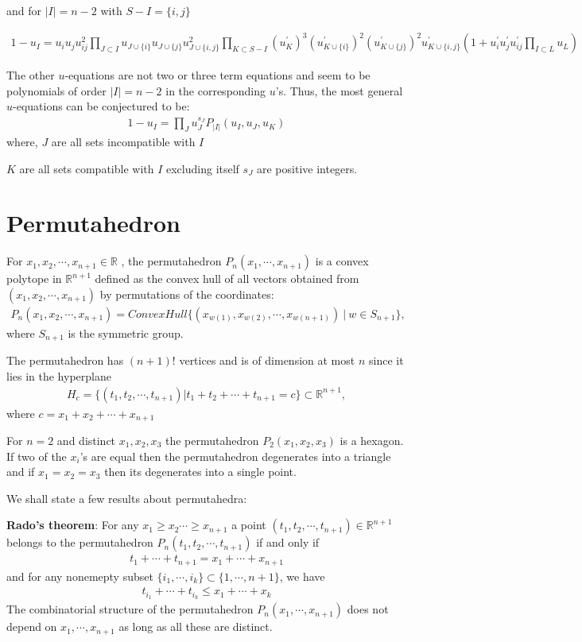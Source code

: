 \documentclass[hidelinks,12pt]{article}
\newcommand{\bea}[1]{\begin{eqnarray}\label{#1} }
\newcommand{\eea}{\end{eqnarray}}
\def\bea{\begin{eqnarray}}
\def\eea{\end{eqnarray}}
\begin{document}
\begin{enumerate}
and for $|I| =n-2$ with $S- I = \{i, j\}$

\bea
1-u_{I}= u_i u_j u^{2}_{ij} \prod_{J \subset I} u_{J \cup \{i\}} u_{J \cup \{j\}} u^{2}_{J \cup \{i,j\}} \prod_{K \subset S-I} (u^{'}_K)^{3} (u^{'}_{K \cup \{i\}})^{2}  (u^{'}_{K \cup\{j\}})^{2}  u^{'}_{K\cup \{i,j\}} \left( 1+ u^{'}_i u^{'}_j u^{'}_{ij} \prod_{I \subset L} u_L \right)                       \nonumber
\eea
   
The other $u$-equations are not two or three term equations and seem to be polynomials of order $|I|=n-2$ in the corresponding $u$'s. Thus, the most general $u$-equations can be conjectured to be:
\bea
1-u_{I} = \prod_{J} u^{s_J}_{J} P_{|I|}(u_I, u_J,u_K) 
\eea
where, $J$ are all sets incompatible with $I$

 $K$ are all sets compatible with $I$ excluding itself 
 $s_J$ are positive integers. 

\end{enumerate}
 





\section*{Permutahedron}
 For $x_1,x_2, \cdots, x_{n+1} \in \mathbb{R} $ , the permutahedron $P_n(x_1,\cdots,x_{n+1})$ is a convex polytope in $\mathbb{R}^{n+1}$ defined as the convex hull of all vectors obtained from $(x_1,x_2, \cdots, x_{n+1})$ by permutations of the coordinates:
 \bea
 P_n(x_1,x_2, \cdots, x_{n+1}) = ConvexHull \{ (x_{w(1)},x_{w(2)}, \cdots, x_{w(n+1)})~ |~ w \in S_{n+1} \}, \nonumber
 \eea
 where $S_{n+1}$ is the symmetric group. 
 
 The permutahedron has $(n+1)!$ vertices and is of dimension at most $n$ since it lies in the hyperplane 
 \bea
 H_c= \{(t_1,t_2, \cdots, t_{n+1}) | t_1 + t_2 + \cdots + t_{n+1}= c \} \subset \mathbb{R}^{n+1}, \nonumber
 \eea
where $c= x_1+x_2+ \cdots +x_{n+1}$

For $n=2$ and distinct $x_1,x_2, x_3$ the permutahedron $P_2(x_1,x_2, x_3)$ is a hexagon. If two of the $x_i$'s are equal then the permutahedron degenerates into a triangle and if $x_1= x_2 = x_3$ then its degenerates into a single point.

We shall state a few results about permutahedra:

{\bf Rado's theorem}: For any $x_1 \ge x_2  \cdots \ge x_{n+1}$ a point $(t_1,t_2, \cdots, t_{n+1}) \in \mathbb{R}^{n+1}$ belongs to the permutahedron $P_n(t_1,t_2, \cdots, t_{n+1})$ if and only if 
\bea
t_1+ \cdots +t_{n+1} = x_1 +\cdots+ x_{n+1} \nonumber
\eea
and for any nonemepty subset $\{i_1,\cdots,i_k \} \subset \{1,\cdots, n+1 \}$, we have 
\bea
t_{i_1}+ \cdots +t_{i_k} \leq x_1 +\cdots+ x_k \nonumber
\eea
The combinatorial structure of the permutahedron $P_n (x_1, \cdots, x_{n+1}) $ does not depend on $ x_1, \cdots, x_{n+1} $ as long as all these are distinct. 
\end{document}
